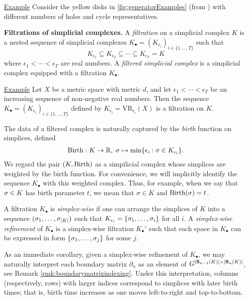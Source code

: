 \noindent \underline{Example} Consider the yellow disks in \fig \ref{fig:generatorExamples} (from  \cite{Carlsson2009TopologyAD}) with different numbers of holes and cycle representatives. 


 

\noindent \textbf{Filtrations of simplicial complexes.} A \emph{filtration} on a simplicial complex $K$ is a nested sequence of  simplicial complexes $K_\bullet = (K_{\epsilon_i})_{i \in\{ 1, \ldots, T\}}$ such that
    $$
    K_{\epsilon_1} \subseteq K_{\epsilon_2} \subseteq \cdots \subseteq K_{\epsilon_T} = K
    $$
where $\epsilon_1 < \cdots < \epsilon_T$ are real numbers. A \emph{filtered simplicial complex} is a simplicial complex equipped with a filtration $K_\bullet$.

\noindent \underline{Example}
 Let  $X$ be a metric space with metric $d$, and let  $\epsilon_1 < \cdots < \epsilon_T$ be an increasing sequence of non-negative real numbers.  Then the sequence $K_\bullet = (K_{\epsilon_i})_{i \in\{ 1, \ldots, T\}}$ defined by $K_{\epsilon_i} = \text{VR}_{\epsilon_i}(X)$ is a filtration on $K$.

The data of a filtered complex is naturally captured by the \emph{birth} function on simplices, defined
    \begin{align*}
        \mathrm{Birth}: K \to \mathbb{R}, \; \sigma \mapsto \min\{ \epsilon_i : \sigma \in K_{\epsilon_i} \}.
    \end{align*}
We regard the pair $(K, \mathrm{Birth})$ as a simpilicial complex whose simplices are weighted by the birth function.   For convenience, we will implicitly identify the sequence $K_\bullet$ with this weighted complex.   Thus, for example, when we say that $\sigma \in K$ has birth parameter $t$, we mean that  $\sigma\in K$ and  $\mathrm{Birth}(\sigma) = t$.


\begin{definition}
A filtration $K_\bullet$ is \emph{simplex-wise} if one can arrange the simplices of $K$ into a sequence $(\sigma_1, \ldots, \sigma_{|K|})$ such that $K_{\epsilon_i} = \{\sigma_1, \ldots, \sigma_i\}$ for all $i$.  
A \emph{simplex-wise refinement}  of $K_\bullet$ is a simplex-wise filtration $K_\bullet'$ such that each space in $K_\bullet$ can be expressed in form $\{\sigma_1, \ldots, \sigma_j\}$ for some $j$.
\end{definition}


As an immediate corollary, given a simplex-wise refinement of $K_\bullet$, we may naturally interpret each boundary matrix $\partial_n$ as an element of $G^{|\mathbf{S}_{n-1}(K)| \times |\mathbf{S}_{n}(K)|}$, see Remark \ref{rmk:boundarymatrixindexing}.  Under this interpretation, columns (respectively, rows) with larger indices correspond to simplices with later birth times; that is, birth time increases as one moves left-to-right and top-to-bottom.  


